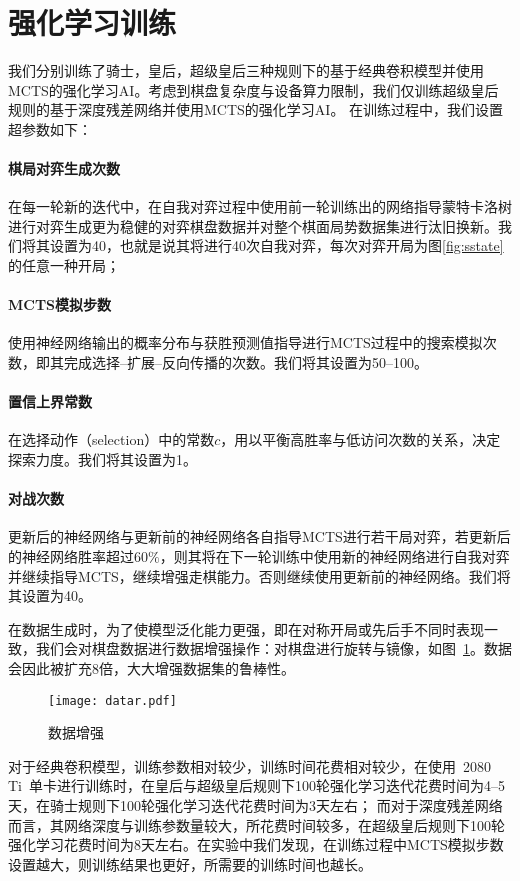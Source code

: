 \section{强化学习训练}
我们分别训练了骑士，皇后，超级皇后三种规则下的基于经典卷积模型并使用MCTS的强化学习AI。考虑到棋盘复杂度与设备算力限制，我们仅训练超级皇后规则的基于深度残差网络并使用MCTS的强化学习AI。
在训练过程中，我们设置超参数如下：
\paragraph{棋局对弈生成次数}
在每一轮新的迭代中，在自我对弈过程中使用前一轮训练出的网络指导蒙特卡洛树进行对弈生成更为稳健的对弈棋盘数据并对整个棋面局势数据集进行汰旧换新。我们将其设置为40，也就是说其将进行40次自我对弈，每次对弈开局为图\ref{fig:sstate}的任意一种开局；
\paragraph{MCTS模拟步数}
使用神经网络输出的概率分布与获胜预测值指导进行MCTS过程中的搜索模拟次数，即其完成选择--扩展--反向传播的次数。我们将其设置为50--100。
\paragraph{置信上界常数}
在选择动作（selection）中的常数$c$，用以平衡高胜率与低访问次数的关系，决定探索力度。我们将其设置为1。
\paragraph{对战次数}
更新后的神经网络与更新前的神经网络各自指导MCTS进行若干局对弈，若更新后的神经网络胜率超过$60\%$，则其将在下一轮训练中使用新的神经网络进行自我对弈并继续指导MCTS，继续增强走棋能力。否则继续使用更新前的神经网络。我们将其设置为40。


在数据生成时，为了使模型泛化能力更强，即在对称开局或先后手不同时表现一致，我们会对棋盘数据进行数据增强操作：对棋盘进行旋转与镜像，如图~\ref{fig:datar}。数据会因此被扩充8倍，大大增强数据集的鲁棒性。
\begin{figure}[H]
    \centering
    \texttt{[image: datar.pdf]}
    \caption[datar]{%
        数据增强%
      }
    \label{fig:datar}
\end{figure}
对于经典卷积模型，训练参数相对较少，训练时间花费相对较少，在使用~2080 Ti~单卡进行训练时，在皇后与超级皇后规则下100轮强化学习迭代花费时间为4--5天，在骑士规则下100轮强化学习迭代花费时间为3天左右；
而对于深度残差网络而言，其网络深度与训练参数量较大，所花费时间较多，在超级皇后规则下100轮强化学习花费时间为8天左右。在实验中我们发现，在训练过程中MCTS模拟步数设置越大，则训练结果也更好，所需要的训练时间也越长。

